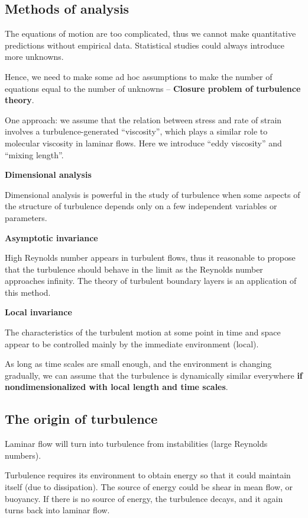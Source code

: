 \subsection{Methods of analysis}

The equations of motion are too complicated, thus we cannot make quantitative predictions without empirical data.
Statistical studies could always introduce more unknowns.

Hence, we need to make some ad hoc assumptions to make the number of equations equal to the number of unknowns -- \textbf{Closure problem of turbulence theory}.

One approach: we assume that the relation between stress and rate of strain involves a turbulence-generated ``viscosity'', which plays a similar role to molecular viscosity in laminar flows.
Here we introduce ``eddy viscosity'' and ``mixing length''.

\textbf{Dimensional analysis}

Dimensional analysis is powerful in the study of turbulence when some aspects of the structure of turbulence depends only on a few independent variables or parameters.

\textbf{Asymptotic invariance}

High Reynolds number appears in turbulent flows, thus it reasonable to propose that the turbulence should behave in the limit as the Reynolds number approaches infinity.
The theory of turbulent boundary layers is an application of this method.

\textbf{Local invariance}

The characteristics of the turbulent motion at some point in time and space appear to be controlled mainly by the immediate environment (local).

As long as time scales are small enough, and the environment is changing gradually, we can assume that the turbulence is dynamically similar everywhere \textbf{if nondimensionalized with local length and time scales}.

\subsection{The origin of turbulence}

Laminar flow will turn into turbulence from instabilities (large Reynolds numbers).

Turbulence requires its environment to obtain energy so that it could maintain itself (due to dissipation). The source of energy could be shear in mean flow, or buoyancy.
If there is no source of energy, the turbulence decays, and it again turns back into laminar flow.


